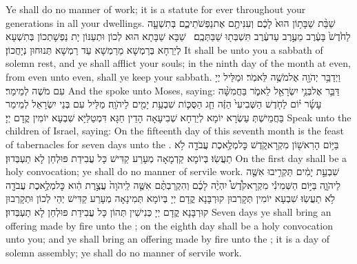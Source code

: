 {Ye shall do no manner of work; it is a statute for ever throughout your generations in all your dwellings.}{}
{שַׁבַּ֨ת שַׁבָּת֥וֹן הוּא֙ לָכֶ֔ם וְעִנִּיתֶ֖ם אֶת\maqqaf נַפְשֹׁתֵיכֶ֑ם בְּתִשְׁעָ֤ה לַחֹ֙דֶשׁ֙ בָּעֶ֔רֶב מֵעֶ֣רֶב עַד\maqqaf עֶ֔רֶב תִּשְׁבְּת֖וּ שַׁבַּתְּכֶֽם׃ \petucha }
{שַׁבָּא שַׁבָּתָא הוּא לְכוֹן וּתְעַנּוֹן יָת נַפְשָׁתְכוֹן בְּתִשְׁעָא לְיַרְחָא בְּרַמְשָׁא מֵרַמְשָׁא עַד רַמְשָׁא תְּנוּחוּן נְיָחֲכוֹן׃}
{It shall be unto you a sabbath of solemn rest, and ye shall afflict your souls; in the ninth day of the month at even, from even unto even, shall ye keep your sabbath.}{}
{וַיְדַבֵּ֥ר יְהֹוָ֖ה אֶל\maqqaf מֹשֶׁ֥ה לֵּאמֹֽר׃}
{וּמַלֵּיל יְיָ עִם מֹשֶׁה לְמֵימַר׃}
{And the \lord\space spoke unto Moses, saying:}{}
{דַּבֵּ֛ר אֶל\maqqaf בְּנֵ֥י יִשְׂרָאֵ֖ל לֵאמֹ֑ר בַּחֲמִשָּׁ֨ה עָשָׂ֜ר י֗וֹם לַחֹ֤דֶשׁ הַשְּׁבִיעִי֙ הַזֶּ֔ה חַ֧ג הַסֻּכּ֛וֹת שִׁבְעַ֥ת יָמִ֖ים לַיהֹוָֽה׃}
{מַלֵּיל עִם בְּנֵי יִשְׂרָאֵל לְמֵימַר בַּחֲמֵישְׁתְּ עַשְׂרָא יוֹמָא לְיַרְחָא שְׁבִיעָאָה הָדֵין חַגָּא דִּמְטַלַּיָּא שִׁבְעָא יוֹמִין קֳדָם יְיָ׃}
{Speak unto the children of Israel, saying: On the fifteenth day of this seventh month is the feast of tabernacles for seven days unto the \lord.}{}
{בַּיּ֥וֹם הָרִאשׁ֖וֹן מִקְרָא\maqqaf קֹ֑דֶשׁ כׇּל\maqqaf מְלֶ֥אכֶת עֲבֹדָ֖ה לֹ֥א תַעֲשֽׂוּ׃}
{בְּיוֹמָא קַדְמָאָה מְעָרַע קַדִּישׁ כָּל עֲבִידַת פּוּלְחַן לָא תַעְבְּדוּן׃}
{On the first day shall be a holy convocation; ye shall do no manner of servile work.}{}
{שִׁבְעַ֣ת יָמִ֔ים תַּקְרִ֥יבוּ אִשֶּׁ֖ה לַיהֹוָ֑ה בַּיּ֣וֹם הַשְּׁמִינִ֡י מִקְרָא\maqqaf קֹ֩דֶשׁ֩ יִהְיֶ֨ה לָכֶ֜ם וְהִקְרַבְתֶּ֨ם אִשֶּׁ֤ה לַֽיהֹוָה֙ עֲצֶ֣רֶת הִ֔וא כׇּל\maqqaf מְלֶ֥אכֶת עֲבֹדָ֖ה לֹ֥א תַעֲשֽׂוּ׃}
{שִׁבְעָא יוֹמִין תְּקָרְבוּן קוּרְבָּנָא קֳדָם יְיָ בְּיוֹמָא תְּמִינָאָה מְעָרַע קַדִּישׁ יְהֵי לְכוֹן וּתְקָרְבוּן קוּרְבָּנָא קֳדָם יְיָ כְּנִישִׁין תְּהוֹן כָּל עֲבִידַת פּוּלְחַן לָא תַעְבְּדוּן׃}
{Seven days ye shall bring an offering made by fire unto the \lord; on the eighth day shall be a holy convocation unto you; and ye shall bring an offering made by fire unto the \lord; it is a day of solemn assembly; ye shall do no manner of servile work.}{}
